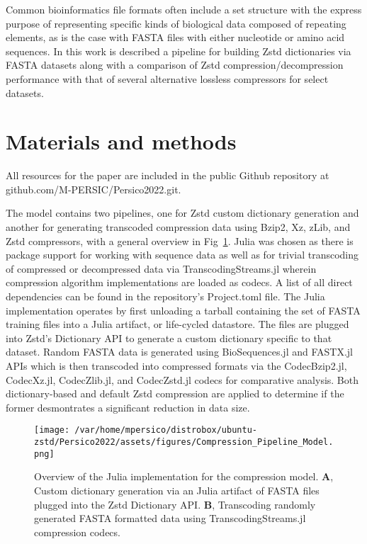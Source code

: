 \documentclass[
  10pt,
  letterpaper,
]{article}
\begin{document}
Common bioinformatics file formats often include a set structure with
the express purpose of representing specific kinds of biological data
composed of repeating elements, as is the case with FASTA files with
either nucleotide or amino acid sequences. In this work is described a
pipeline for building Zstd dictionaries via FASTA datasets along with a
comparison of Zstd compression/decompression performance with that of
several alternative lossless compressors for select datasets.

\hypertarget{materials-and-methods}{%
\section{Materials and methods}\label{materials-and-methods}}

All resources for the paper are included in the public Github repository
at github.com/M-PERSIC/Persico2022.git.

The model contains two pipelines, one for Zstd custom dictionary
generation and another for generating transcoded compression data using
Bzip2, Xz, zLib, and Zstd compressors, with a general overview in
Fig~\ref{fig-model}. Julia was chosen as there is package support for
working with sequence data as well as for trivial transcoding of
compressed or decompressed data via TranscodingStreams.jl wherein
compression algorithm implementations are loaded as codecs\citep{sato}.
A list of all direct dependencies can be found in the repository's
Project.toml file. The Julia implementation operates by first unloading
a tarball containing the set of FASTA training files into a Julia
artifact, or life-cycled datastore. The files are plugged into Zstd's
Dictionary API to generate a custom dictionary specific to that dataset.
Random FASTA data is generated using BioSequences.jl\citep{biosequences}
and FASTX.jl\citep{fastx} APIs which is then transcoded into compressed
formats via the CodecBzip2.jl\citep{codecbzip2},
CodecXz.jl\citep{codecxz}, CodecZlib.jl\citep{codeczlib}, and
CodecZstd.jl\citep{codeczstd} codecs for comparative analysis. Both
dictionary-based and default Zstd compression are applied to determine
if the former desmontrates a significant reduction in data size.

\begin{figure}

{\centering \texttt{[image: /var/home/mpersico/distrobox/ubuntu-zstd/Persico2022/assets/figures/Compression\_Pipeline\_Model.png]}

}

\caption{\label{fig-model}Overview of the Julia implementation for the
compression model. \textbf{A}, Custom dictionary generation via an Julia
artifact of FASTA files plugged into the Zstd Dictionary API.
\textbf{B}, Transcoding randomly generated FASTA formatted data using
TranscodingStreams.jl\citep{sato} compression codecs.}

\end{figure}
\end{document}
